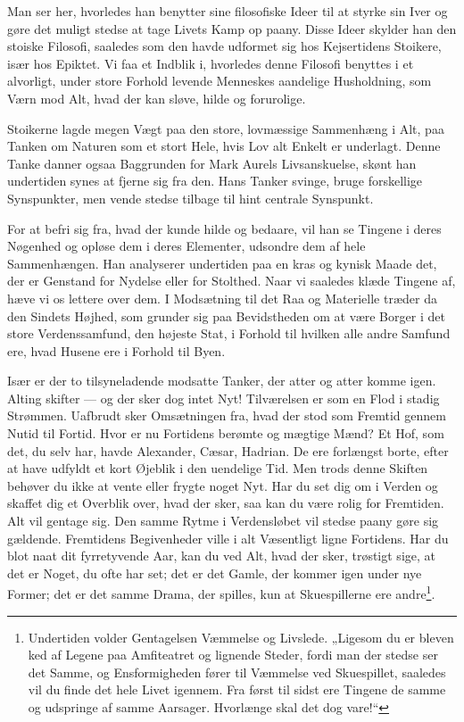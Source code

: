 \documentclass[12pt,a4paper,openany]{book}
\newcommand{\opage}[1]{\marginnote{\footnotesize\textit{[#1]}}}
\begin{document}
Man ser her, hvorledes han benytter sine filosofiske Ideer
til at styrke sin Iver og gøre det muligt stedse at tage Livets
Kamp op paany. Disse Ideer skylder han den stoiske Filosofi,
saaledes som den havde udformet sig hos Kejsertidens Stoikere,
især hos Epiktet. Vi faa et Indblik i, hvorledes denne Filosofi
benyttes i et alvorligt, under store Forhold levende Menneskes
aandelige Husholdning, som Værn mod Alt, hvad der kan sløve,
hilde og forurolige.

Stoikerne lagde megen Vægt paa den store, lovmæssige
Sammenhæng i Alt, paa Tanken om Naturen som et stort Hele,
hvis Lov alt Enkelt er underlagt. Denne Tanke danner ogsaa
Baggrunden for Mark Aurels Livsanskuelse, skønt han undertiden
synes at fjerne sig fra den. Hans Tanker svinge, bruge
forskellige Synspunkter, men vende stedse tilbage til hint centrale
Synspunkt.

For at befri sig fra, hvad der kunde hilde og bedaare, vil
han se Tingene i deres Nøgenhed og opløse dem i deres Elementer,
udsondre dem af hele Sammenhængen. Han analyserer
undertiden paa en kras og kynisk Maade det, der er Genstand
for Nydelse eller for Stolthed. Naar vi saaledes klæde Tingene
af, hæve vi os lettere over dem. I Modsætning til det Raa
og Materielle træder da den Sindets Højhed, som grunder sig
paa Bevidstheden om at være Borger i det store Verdenssamfund,
den højeste Stat, i Forhold til hvilken alle andre Samfund
ere, hvad Husene ere i Forhold til Byen.

Især er der to tilsyneladende modsatte Tanker, der atter
og atter komme igen. Alting skifter --- og der sker dog intet
Nyt! Tilværelsen er som en Flod i stadig Strømmen. Uafbrudt
sker Omsætningen fra, hvad der stod som Fremtid gennem Nutid
til Fortid. Hvor er nu Fortidens berømte og mægtige
Mænd? Et Hof, som det, du selv har, havde Alexander, Cæsar,
Hadrian. De ere forlængst borte, efter at have udfyldt et kort
\setcounter{footnote}{0}%
\opage{115}Øjeblik i den uendelige Tid. Men trods denne Skiften behøver
du ikke at vente eller frygte noget Nyt. Har du set dig om
i Verden og skaffet dig et Overblik over, hvad der sker, saa
kan du være rolig for Fremtiden. Alt vil gentage sig. Den
samme Rytme i Verdensløbet vil stedse paany gøre sig gældende.
Fremtidens Begivenheder ville i alt Væsentligt ligne
Fortidens. Har du blot naat dit fyrretyvende Aar, kan du ved
Alt, hvad der sker, trøstigt sige, at det er Noget, du ofte har
set; det er det Gamle, der kommer igen under nye Former;
det er det samme Drama, der spilles, kun at Skuespillerne ere
andre\footnote[1]{Undertiden volder Gentagelsen Væmmelse og Livslede. „Ligesom du er bleven ked af Legene paa Amfiteatret og lignende Steder, fordi man der stedse ser det Samme, og Ensformigheden fører til Væmmelse ved Skuespillet, saaledes vil du finde det hele Livet igennem. Fra først til sidst ere Tingene de samme og udspringe af samme Aarsager. Hvorlænge skal det dog vare!“}.
\end{document}
